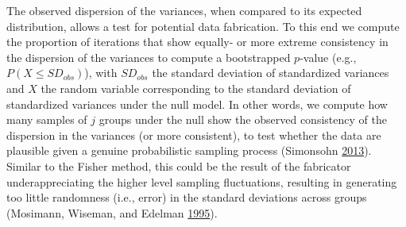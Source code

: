 \documentclass[a5paper]{book}
\begin{document}
The observed dispersion of the variances, when compared to its expected
distribution, allows a test for potential data fabrication. To this end
we compute the proportion of iterations that show equally- or more
extreme consistency in the dispersion of the variances to compute a
bootstrapped \(p\)-value (e.g., \(P(X\leq SD_{obs})\)), with
\(SD_{obs}\) the standard deviation of standardized variances and \(X\)
the random variable corresponding to the standard deviation of
standardized variances under the null model. In other words, we compute
how many samples of \(j\) groups under the null show the observed
consistency of the dispersion in the variances (or more consistent), to
test whether the data are plausible given a genuine probabilistic
sampling process (Simonsohn
\protect\hyperlink{ref-doi:10.1177ux2f0956797613480366}{2013}). Similar
to the Fisher method, this could be the result of the fabricator
underappreciating the higher level sampling fluctuations, resulting in
generating too little randomness (i.e., error) in the standard
deviations across groups (Mosimann, Wiseman, and Edelman
\protect\hyperlink{ref-doi:10.1080ux2f08989629508573866}{1995}).
\end{document}
